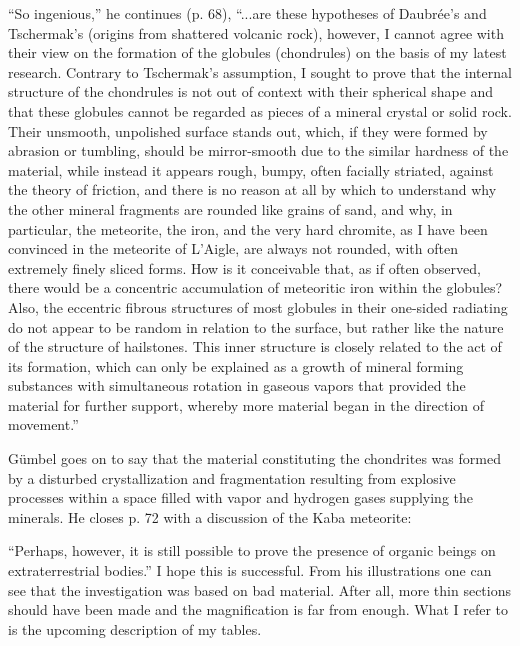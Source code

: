 \documentclass[a4paper, 12pt, oneside]{article}
\begin{document}
``So ingenious,'' he continues (p. 68), ``...are these hypotheses of Daubrée's and Tschermak's (origins from shattered volcanic rock), however, I cannot agree with their view on the formation of the globules (chondrules) on the basis of my latest research. Contrary to Tschermak's assumption, I sought to prove that the internal structure of the chondrules is not out of context with their spherical shape and that these globules cannot be regarded as pieces of a mineral crystal or solid rock. Their unsmooth, unpolished surface stands out, which, if they were formed by abrasion or tumbling, should be mirror-smooth due to the similar hardness of the material, while instead it appears rough, bumpy, often facially striated, against the theory of friction, and there is no reason at all by which to understand why the other mineral fragments are rounded like grains of sand, and why, in particular, the meteorite, the iron, and the very hard chromite, as I have been convinced in the meteorite of L'Aigle, are always not rounded, with often extremely finely sliced forms. How is it conceivable that, as if often observed, there would be a concentric accumulation of meteoritic iron within the globules? Also, the eccentric fibrous structures of most globules in their one-sided radiating do not appear to be random in relation to the surface, but rather like the nature of the structure of hailstones. This inner structure is closely related to the act of its formation, which can only be explained as a growth of mineral forming substances with simultaneous rotation in gaseous vapors that provided the material for further support, whereby more material began in the direction of movement.''

Gümbel goes on to say that the material constituting the chondrites was formed by a disturbed crystallization and fragmentation resulting from explosive processes within a space filled with vapor and hydrogen gases supplying the minerals. He closes p. 72 with a discussion of the Kaba meteorite:

``Perhaps, however, it is still possible to prove the presence of organic beings on extraterrestrial bodies.'' I hope this is successful. From his illustrations one can see that the investigation was based on bad material. After all, more thin sections should have been made and the magnification is far from enough. What I refer to is the upcoming description of my tables.
\end{document}
